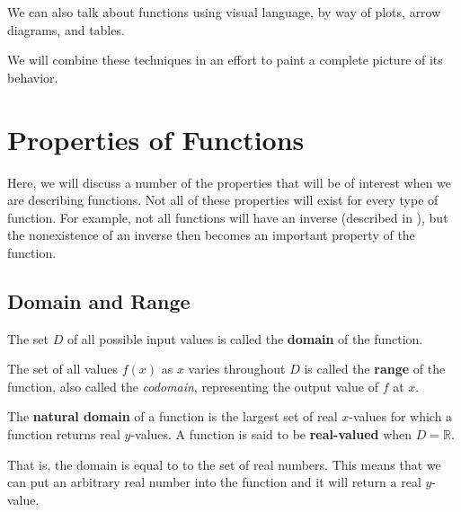 We can also talk about functions using visual language,
by way of plots,
arrow diagrams,
and tables.


We will combine these techniques in an effort to paint a complete picture of its 
behavior.

\section{Properties of Functions}

Here, we will discuss a number of the properties that will be of interest when we
are describing functions.
Not all of these properties will exist for every type of function.
For example, not all functions will have an inverse 
(described in ), 
but the nonexistence of an inverse then becomes an important property of the 
function. %

\subsection{Domain and Range}

\begin{defn}
    The set $D$ of all possible input values is called the \textbf{domain} of 
    the function.
\end{defn}

\begin{defn}
    The set of all values $f(x)$ as $x$ varies throughout $D$ is called 
    the \textbf{range} of the function, also called the \emph{codomain},
    representing the output value of $f$ at $x$.
\end{defn}

\begin{defn}
    The \textbf{natural domain} of a function is the largest set of real 
    $x$-values for which a function returns real $y$-values.
    A function is said to be \textbf{real-valued} when $D = \mathbb{R}$.
\end{defn}
That is, the domain is equal to to the set of real numbers.
This means that we can put an arbitrary real number into the function and it 
will return a real $y$-value.

